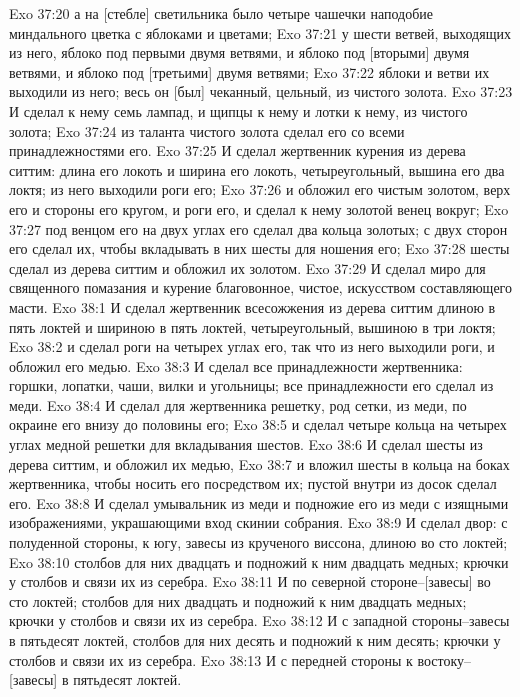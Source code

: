 Exo 37:20  а на [стебле] светильника было четыре чашечки наподобие миндального цветка с яблоками и цветами;
Exo 37:21  у шести ветвей, выходящих из него, яблоко под первыми двумя ветвями, и яблоко под [вторыми] двумя ветвями, и яблоко под [третьими] двумя ветвями;
Exo 37:22  яблоки и ветви их выходили из него; весь он [был] чеканный, цельный, из чистого золота.
Exo 37:23  И сделал к нему семь лампад, и щипцы к нему и лотки к нему, из чистого золота;
Exo 37:24  из таланта чистого золота сделал его со всеми принадлежностями его.
Exo 37:25  И сделал жертвенник курения из дерева ситтим: длина его локоть и ширина его локоть, четыреугольный, вышина его два локтя; из него выходили роги его;
Exo 37:26  и обложил его чистым золотом, верх его и стороны его кругом, и роги его, и сделал к нему золотой венец вокруг;
Exo 37:27  под венцом его на двух углах его сделал два кольца золотых; с двух сторон его сделал их, чтобы вкладывать в них шесты для ношения его;
Exo 37:28  шесты сделал из дерева ситтим и обложил их золотом.
Exo 37:29  И сделал миро для священного помазания и курение благовонное, чистое, искусством составляющего масти.
Exo 38:1  И сделал жертвенник всесожжения из дерева ситтим длиною в пять локтей и шириною в пять локтей, четыреугольный, вышиною в три локтя;
Exo 38:2  и сделал роги на четырех углах его, так что из него выходили роги, и обложил его медью.
Exo 38:3  И сделал все принадлежности жертвенника: горшки, лопатки, чаши, вилки и угольницы; все принадлежности его сделал из меди.
Exo 38:4  И сделал для жертвенника решетку, род сетки, из меди, по окраине его внизу до половины его;
Exo 38:5  и сделал четыре кольца на четырех углах медной решетки для вкладывания шестов.
Exo 38:6  И сделал шесты из дерева ситтим, и обложил их медью,
Exo 38:7  и вложил шесты в кольца на боках жертвенника, чтобы носить его посредством их; пустой внутри из досок сделал его.
Exo 38:8  И сделал умывальник из меди и подножие его из меди с изящными изображениями, украшающими вход скинии собрания.
Exo 38:9  И сделал двор: с полуденной стороны, к югу, завесы из крученого виссона, длиною во сто локтей;
Exo 38:10  столбов для них двадцать и подножий к ним двадцать медных; крючки у столбов и связи их из серебра.
Exo 38:11  И по северной стороне--[завесы] во сто локтей; столбов для них двадцать и подножий к ним двадцать медных; крючки у столбов и связи их из серебра.
Exo 38:12  И с западной стороны--завесы в пятьдесят локтей, столбов для них десять и подножий к ним десять; крючки у столбов и связи их из серебра.
Exo 38:13  И с передней стороны к востоку--[завесы] в пятьдесят локтей.
